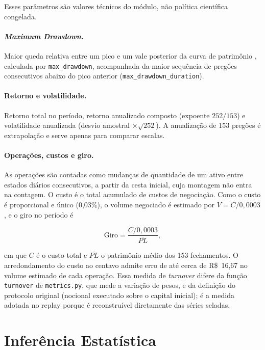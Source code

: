 \noindent Esses parâmetros são valores técnicos do módulo, não política científica congelada.

\paragraph*{\textit{Maximum Drawdown}.} Maior queda relativa entre um pico e um vale posterior da curva de patrimônio \citep{Magdon2004}, calculada por \texttt{max\_drawdown}, acompanhada da maior sequência de pregões consecutivos abaixo do pico anterior (\texttt{max\_drawdown\_duration}).

\paragraph*{Retorno e volatilidade.} Retorno total no período, retorno anualizado composto (expoente $252/153$) e volatilidade anualizada (desvio amostral $\times\sqrt{252}$). A anualização de 153 pregões é extrapolação e serve apenas para comparar escalas.

\paragraph*{Operações, custos e giro.} As operações são contadas como mudanças de quantidade de um ativo entre estados diários consecutivos, a partir da cesta inicial, cuja montagem não entra na contagem. O custo é o total acumulado de custos de negociação. Como o custo é proporcional e único (0,03\%), o volume negociado é estimado por $V = C / 0{,}0003$, e o giro no período é

\begin{equation}
\text{Giro} = \frac{C / 0{,}0003}{\overline{PL}},
\label{eq:met-giro}
\end{equation}

\noindent em que $C$ é o custo total e $\overline{PL}$ o patrimônio médio dos 153 fechamentos. O arredondamento do custo ao centavo admite erro de até cerca de R\$~16,67 no volume estimado de cada operação. Essa medida de \textit{turnover} difere da função \texttt{turnover} de \texttt{metrics.py}, que mede a variação de pesos, e da definição do protocolo original (nocional executado sobre o capital inicial); é a medida adotada no replay porque é reconstruível diretamente das séries seladas.

\section{Inferência Estatística}
\label{sec:met-inferencia}

